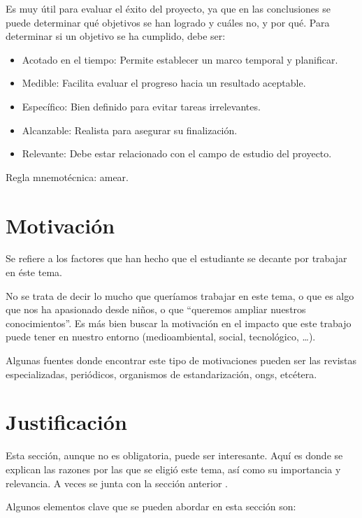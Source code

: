 \documentclass[%
    school=etsisi,%
    degree=61TI,%
]{upm-report}
\begin{document}
Es muy útil para evaluar el éxito del proyecto, ya que en las
conclusiones se puede determinar qué objetivos se han logrado y cuáles
no, y por qué. Para determinar si un objetivo se ha cumplido, debe ser:

\begin{itemize}
    \item Acotado en el tiempo: Permite establecer un marco temporal y
        planificar.
    \item Medible: Facilita evaluar el progreso hacia un resultado
        aceptable.
    \item Específico: Bien definido para evitar tareas irrelevantes.
    \item Alcanzable: Realista para asegurar su finalización.
    \item Relevante: Debe estar relacionado con el campo de estudio del
        proyecto.
\end{itemize}

Regla mnemotécnica: \gls{amear}.

\section{Motivación}
\label{s:motivacion}

Se refiere a los factores que han hecho que el estudiante se decante por
trabajar en éste tema.

No se trata de decir lo mucho que queríamos trabajar en este tema, o que
es algo que nos ha apasionado desde niños, o que \enquote{queremos
ampliar nuestros conocimientos}. Es más bien buscar la motivación en el
impacto que este trabajo puede tener en nuestro entorno (medioambiental,
social, tecnológico, \ldots).

Algunas fuentes donde encontrar este tipo de motivaciones pueden ser las
revistas especializadas, periódicos, organismos de estandarización,
\glspl{ong}, etcétera.

\section{Justificación}

Esta sección, aunque no es obligatoria, puede ser interesante. Aquí es
donde se explican las razones por las que se eligió este tema, así como
su importancia y relevancia. A veces se junta con la sección anterior
.

Algunos elementos clave que se pueden abordar en esta sección son:
\end{document}
